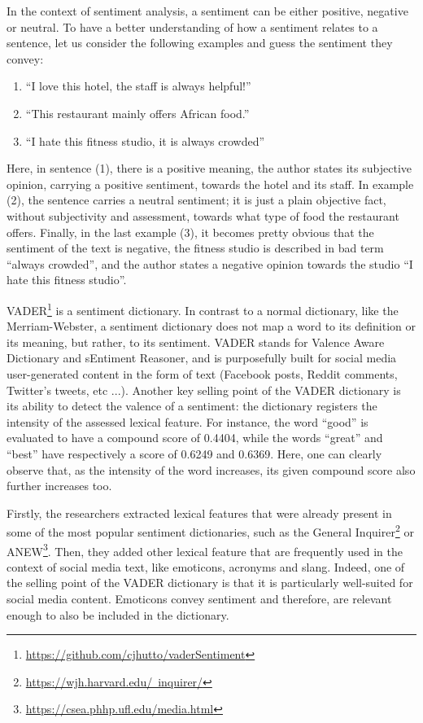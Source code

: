 	In the context of sentiment analysis, a sentiment can be either positive, negative or neutral. To have a better understanding of how a sentiment relates to a sentence, let us consider the following examples and guess the sentiment they convey:
	\begin{enumerate}
	\item[(1)] ``I love this hotel, the staff is always helpful!''
	\item[(2)] ``This restaurant mainly offers African food.''
	\item[(3)] ``I hate this fitness studio, it is always crowded''
	\end{enumerate}

	Here, in sentence (1), there is a positive meaning, the author states its subjective opinion, carrying a positive sentiment, towards the hotel and its staff. In example (2), the sentence carries a neutral sentiment; it is just a plain objective fact, without subjectivity and assessment, towards what type of food the restaurant offers. Finally, in the last example (3), it becomes pretty obvious that the sentiment of the text is negative, the fitness studio is described in bad term ``always crowded'', and the author states a negative opinion towards the studio ``I hate this fitness studio''.
	
	VADER\footnote{\href{https://github.com/cjhutto/vaderSentiment}{https://github.com/cjhutto/vaderSentiment}} is a sentiment dictionary. In contrast to a normal dictionary, like the Merriam-Webster, a sentiment dictionary does not map a word to its definition or its meaning, but rather, to its sentiment.
	VADER stands for Valence Aware Dictionary and sEntiment Reasoner, and is purposefully built for social media user-generated content in the form of text (Facebook posts, Reddit comments, Twitter's tweets, etc ...). Another key selling point of the VADER dictionary is its ability to detect the valence of a sentiment: the dictionary registers the intensity of the assessed lexical feature. For instance, the word ``good'' is evaluated to have a compound score of 0.4404, while the words ``great'' and ``best'' have respectively a score of 0.6249 and 0.6369. Here, one can clearly observe that, as the intensity of the word increases, its given compound score also further increases too.\newline
	
	Firstly, the researchers extracted lexical features that were already present in some of the most popular sentiment dictionaries, such as the General Inquirer\footnote{\href{https://wjh.harvard.edu/~inquirer/}{https://wjh.harvard.edu/~inquirer/}} or ANEW\footnote{\href{https://csea.phhp.ufl.edu/media.html}{https://csea.phhp.ufl.edu/media.html}}. Then, they added other lexical feature that are frequently used in the context of social media text, like emoticons, acronyms and slang. Indeed, one of the selling point of the VADER dictionary is that it is particularly well-suited for social media content. Emoticons convey sentiment and therefore, are relevant enough to also be included in the dictionary.
	
